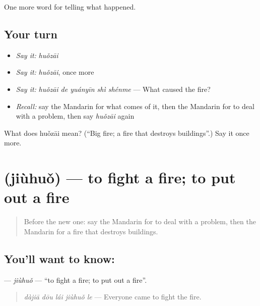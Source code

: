 \begin{grammarlens}[title={What you've built}]
One more word for telling what happened.
\end{grammarlens}

\subsection*{Your turn}
\begin{itemize}
\raggedright
  \item \emph{Say it:} \emph{huǒzāi}
  \item \emph{Say it:} \emph{huǒzāi}, once more
  \item \emph{Say it:} \emph{huǒzāi de yuányīn shì shénme} — What caused the fire?
  \item \emph{Recall:} say the Mandarin for what comes of it, then the Mandarin for to deal with a problem, then say \emph{huǒzāi} again
\end{itemize}

\begin{tcolorbox}[breakable,colback=teal!4,colframe=teal!35!black,title={Before you move on}]
What does huǒzāi mean? (\textquotedblleft{}Big fire; a fire that destroys buildings\textquotedblright{}.) Say it once more.
\end{tcolorbox}
\section[\texorpdfstring{\zh{救火} (jiùhuǒ)}{救火 (jiùhuǒ)}]{ (jiùhuǒ) — to fight a fire; to put out a fire}

\label{lesson:ZH-C298-jiuhuo}



\begin{quote}
Before the new one: say the Mandarin for to deal with a problem, then the Mandarin for a fire that destroys buildings.
\end{quote}

\subsection*{You'll want to know: }
\textbf{} — \emph{jiùhuǒ} — \textquotedblleft{}to fight a fire; to put out a fire\textquotedblright{}.

\begin{quote}
\textbf{} \emph{dàjiā dōu lái jiùhuǒ le} — Everyone came to fight the fire.
\end{quote}

